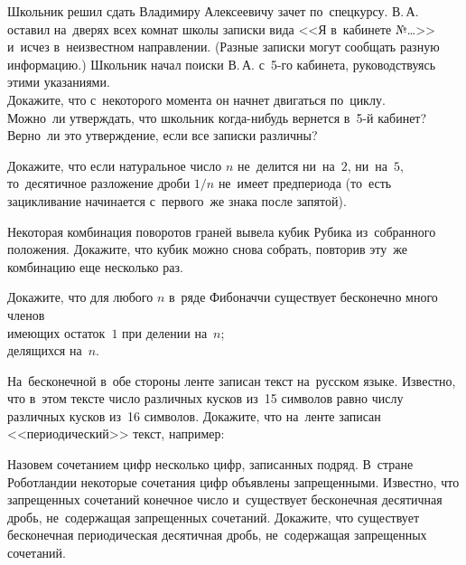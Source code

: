 


\begin{problems}

\item
Школьник решил сдать Владимиру Алексеевичу зачет по~спецкурсу.
В.\,А. оставил на~дверях всех комнат школы записки вида
<<Я в~кабинете №\ldots>> и~исчез в~неизвестном направлении.
(Разные записки могут сообщать разную информацию.)
Школьник начал поиски В.\,А. с~5-го кабинета, руководствуясь этими указаниями.
\\
\subproblem
Докажите, что с~некоторого момента он начнет двигаться по~циклу.
\\
\subproblem
Можно~ли утверждать, что школьник когда-нибудь вернется в~5-й кабинет?
Верно~ли это утверждение, если все записки различны?

\item
Докажите, что если натуральное число $n$ не~делится ни~на~$2$, ни~на~$5$,
то~десятичное разложение дроби $1/n$ не~имеет предпериода
(то~есть зацикливание начинается с~первого~же знака после запятой).

\item
Некоторая комбинация поворотов граней вывела кубик Рубика из~собранного
положения.
Докажите, что кубик можно снова собрать, повторив эту~же комбинацию еще
несколько раз.

\item
Докажите, что для любого $n$ в~ряде Фибоначчи существует бесконечно много членов
\\
\subproblem имеющих остаток~$1$ при делении на~$n$;
\\
\subproblem делящихся на~$n$.

\item
На~бесконечной в~обе стороны ленте записан текст на~русском языке.
Известно, что в~этом тексте число различных кусков из~15 символов равно числу
различных кусков из~16 символов.
Докажите, что на~ленте записан <<периодический>> текст, например:
\\

\item
Назовем сочетанием цифр несколько цифр, записанных подряд.
В~стране Роботландии некоторые сочетания цифр объявлены запрещенными.
Известно, что запрещенных сочетаний конечное число и~существует бесконечная
десятичная дробь, не~содержащая запрещенных сочетаний.
Докажите, что существует бесконечная периодическая десятичная дробь,
не~содержащая запрещенных сочетаний.


\end{problems}
